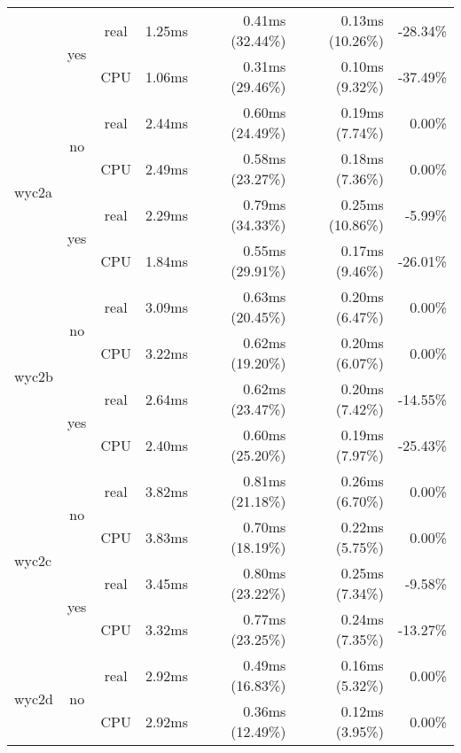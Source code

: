 \documentclass[en]{pracamgr}
\begin{document}
\begin{small}
\begin{longtable}{|l|c|c|r|r|r|r|}
                          \cline{2-7}
                          & \multirow{2}{*}{yes} & real & 1.25ms & 0.41ms (32.44\%) & 0.13ms (10.26\%) & -28.34\% \\*
                          &                      & CPU  & 1.06ms & 0.31ms (29.46\%) & 0.10ms (9.32\%) & -37.49\% \\
\hline
\multirow{4}{*}{wyc2a}    & \multirow{2}{*}{no}  & real & 2.44ms & 0.60ms (24.49\%) & 0.19ms (7.74\%) & 0.00\% \\*
                          &                      & CPU  & 2.49ms & 0.58ms (23.27\%) & 0.18ms (7.36\%) & 0.00\% \\*
                          \cline{2-7}
                          & \multirow{2}{*}{yes} & real & 2.29ms & 0.79ms (34.33\%) & 0.25ms (10.86\%) & -5.99\% \\*
                          &                      & CPU  & 1.84ms & 0.55ms (29.91\%) & 0.17ms (9.46\%) & -26.01\% \\
\hline
\multirow{4}{*}{wyc2b}    & \multirow{2}{*}{no}  & real & 3.09ms & 0.63ms (20.45\%) & 0.20ms (6.47\%) & 0.00\% \\*
                          &                      & CPU  & 3.22ms & 0.62ms (19.20\%) & 0.20ms (6.07\%) & 0.00\% \\*
                          \cline{2-7}
                          & \multirow{2}{*}{yes} & real & 2.64ms & 0.62ms (23.47\%) & 0.20ms (7.42\%) & -14.55\% \\*
                          &                      & CPU  & 2.40ms & 0.60ms (25.20\%) & 0.19ms (7.97\%) & -25.43\% \\
\hline
\multirow{4}{*}{wyc2c}    & \multirow{2}{*}{no}  & real & 3.82ms & 0.81ms (21.18\%) & 0.26ms (6.70\%) & 0.00\% \\*
                          &                      & CPU  & 3.83ms & 0.70ms (18.19\%) & 0.22ms (5.75\%) & 0.00\% \\*
                          \cline{2-7}
                          & \multirow{2}{*}{yes} & real & 3.45ms & 0.80ms (23.22\%) & 0.25ms (7.34\%) & -9.58\% \\*
                          &                      & CPU  & 3.32ms & 0.77ms (23.25\%) & 0.24ms (7.35\%) & -13.27\% \\
\hline
\multirow{4}{*}{wyc2d}    & \multirow{2}{*}{no}  & real & 2.92ms & 0.49ms (16.83\%) & 0.16ms (5.32\%) & 0.00\% \\*
                          &                      & CPU  & 2.92ms & 0.36ms (12.49\%) & 0.12ms (3.95\%) & 0.00\% \\*

\end{longtable}
\end{small}
\end{document}
